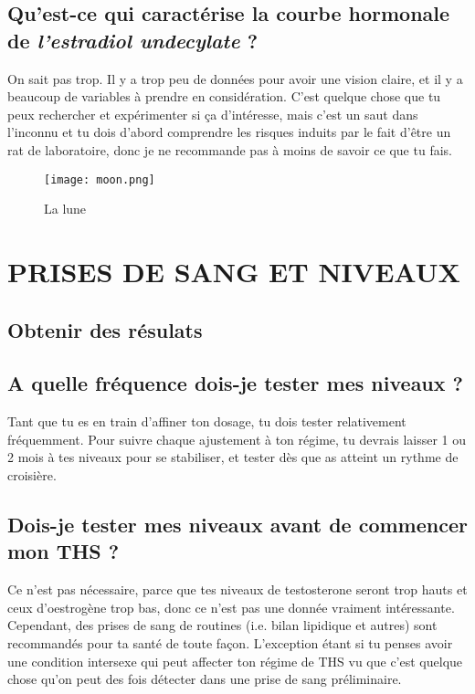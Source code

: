 \documentclass{article}
\begin{document}
\subsection{Qu'est-ce qui caractérise la courbe hormonale de \textit{l'estradiol undecylate} ?}

On sait pas trop. Il y a trop peu de données pour avoir une vision claire, et il y a beaucoup de variables à prendre en considération. C'est quelque chose que tu peux rechercher et expérimenter si ça d'intéresse, mais c'est un saut dans l'inconnu et tu dois d'abord comprendre les risques induits par le fait d'être un rat de laboratoire, donc je ne recommande pas à moins de savoir ce que tu fais.

 \begin{figure}[H]
     \centering
     \texttt{[image: moon.png]}
     \caption{La lune}
     \label{fig:moon}
 \end{figure}

 

\section{PRISES DE SANG ET NIVEAUX}

\subsection*{Obtenir des résulats}

\subsection{A quelle fréquence dois-je tester mes niveaux ?}

Tant que tu es en train d'affiner ton dosage, tu dois tester relativement fréquemment. Pour suivre chaque ajustement à ton régime, tu devrais laisser 1 ou 2 mois à tes niveaux pour se stabiliser, et tester dès que as atteint un rythme de croisière.

\subsection{Dois-je tester mes niveaux avant de commencer mon THS ?}

Ce n'est pas nécessaire, parce que tes niveaux de testosterone seront trop hauts et ceux d'oestrogène trop bas, donc ce n'est pas une donnée vraiment intéressante. Cependant, des prises de sang de routines (i.e. bilan lipidique et autres) sont recommandés pour ta santé de toute façon. L'exception étant si tu penses avoir une condition intersexe qui peut affecter ton régime de THS vu que c'est quelque chose qu'on peut des fois détecter dans une prise de sang préliminaire.
\end{document}
